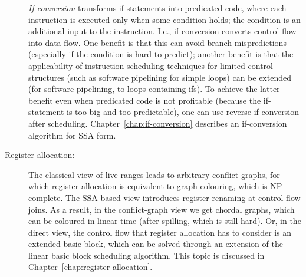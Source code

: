 \begin{description}
  \emph{If-conversion} transforms if-statements into predicated code,
  where each instruction is executed only when some condition holds;
  the condition is an additional input to the instruction.  I.e.,
  if-conversion converts control flow into data flow.  One benefit is
  that this can avoid branch mispredictions (especially if the
  condition is hard to predict); another benefit is that the
  applicability of instruction scheduling techniques for limited
  control structures (such as software pipelining for simple loops)
  can be extended (for software pipelining, to loops containing ifs).
  To achieve the latter benefit even when predicated code is not
  profitable (because the if-statement is too big and too
  predictable), one can use reverse if-conversion after scheduling.
  Chapter~\ref{chap:if-conversion} describes an if-conversion
  algorithm for SSA form.

\item[Register allocation:] The classical view of live ranges leads to
  arbitrary conflict graphs, for which register allocation is
  equivalent to graph colouring, which is NP-complete.  The SSA-based
  view introduces register renaming at control-flow joins.  As a
  result, in the conflict-graph view we get chordal graphs, which can
  be coloured in linear time (after spilling, which is still hard).
  Or, in the direct view, the control flow that register allocation
  has to consider is an extended basic block, which can be solved
  through an extension of the linear basic block scheduling algorithm.
  This topic is discussed in Chapter~\ref{chap:register-allocation}.

\end{description}

%

